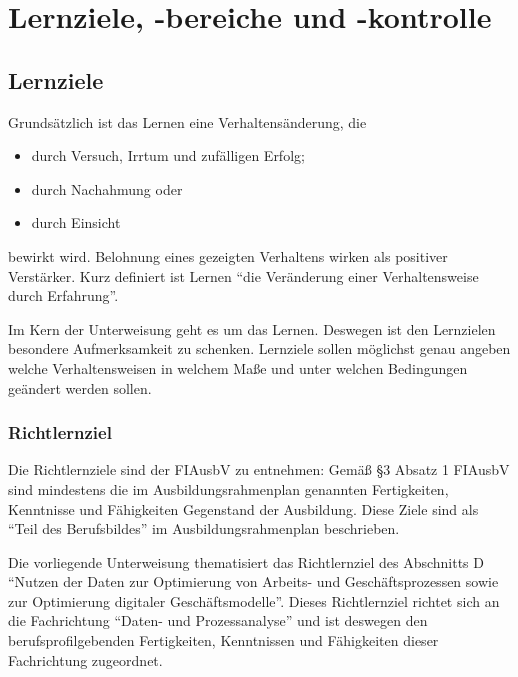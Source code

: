 \chapter{Lernziele, -bereiche und -kontrolle}

\section{Lernziele}
Grundsätzlich ist das Lernen eine Verhaltensänderung, die 

\begin{itemize}
	\item durch Versuch, Irrtum und zufälligen Erfolg;
	\item durch Nachahmung oder 
	\item durch Einsicht
\end{itemize}

bewirkt wird. Belohnung eines gezeigten Verhaltens wirken als positiver Verstärker. Kurz definiert ist Lernen \enquote{die Veränderung einer Verhaltensweise durch Erfahrung}.
\par
Im Kern der Unterweisung geht es um das Lernen. Deswegen ist den Lernzielen besondere Aufmerksamkeit zu schenken. Lernziele sollen möglichst genau angeben welche Verhaltensweisen in welchem Maße und unter welchen Bedingungen geändert werden sollen. 

\subsection{Richtlernziel}
Die Richtlernziele sind der \ac{FIAusbV} zu entnehmen: Gemäß §3 Absatz 1 FIAusbV\autocite[][§3 I FIAusbV]{bundesminister_fur_wirtschaft_und_energie_verordnung_2020} sind mindestens die im Ausbildungsrahmenplan genannten Fertigkeiten, Kenntnisse und Fähigkeiten Gegenstand der Ausbildung. Diese Ziele sind als \enquote{Teil des Berufsbildes} im Ausbildungsrahmenplan beschrieben. 
\par
Die vorliegende Unterweisung thematisiert das Richtlernziel des Abschnitts D \enquote{Nutzen der Daten zur Optimierung von Arbeits- und Geschäftsprozessen sowie zur Optimierung digitaler Geschäftsmodelle}\autocite[vgl.][§4 V Nr.\,3 FIAusbV]{bundesminister_fur_wirtschaft_und_energie_verordnung_2020}. Dieses Richtlernziel richtet sich an die Fachrichtung \enquote{Daten- und Prozessanalyse} und ist deswegen den berufsprofilgebenden Fertigkeiten, Kenntnissen und Fähigkeiten dieser Fachrichtung zugeordnet.

